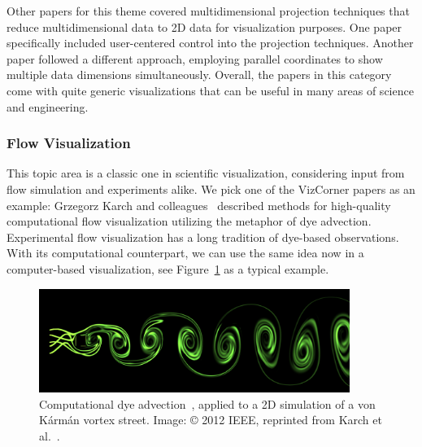 \documentclass[10pt,journal,compsoc]{IEEEtran}
\begin{document}
Other papers for this theme covered multidimensional projection techniques that reduce multidimensional data to 2D data for visualization purposes. One paper specifically included user-centered control into the projection techniques. Another paper followed a different approach, employing parallel coordinates to show multiple data dimensions simultaneously. Overall, the papers in this category come with quite generic visualizations that can be useful in many areas of science and engineering.

\subsubsection{Flow Visualization}

This topic area is a classic one in scientific visualization, considering input from flow simulation and experiments alike. We pick one of the VizCorner papers as an example: Grzegorz Karch and colleagues~\cite{Karch2012} described methods for high-quality computational flow visualization utilizing the metaphor of dye advection. Experimental flow visualization has a long tradition of dye-based observations. With its computational counterpart, we can use the same idea now in a computer-based visualization, see Figure~\ref{fig:karman} as a typical example. 

\begin{figure}
	\begin{center}	
		\includegraphics[width=0.9\textwidth]{karman_weno3.png}
		\caption{Computational dye advection~\cite{Karch2012}, applied to a 2D simulation of a von K{\'a}rm{\'a}n vortex street. Image: \copyright{} 2012 IEEE, reprinted from Karch et al.~\cite{Karch2012}.
  \label{fig:karman}}		
	\end{center}
\end{figure}
\end{document}
